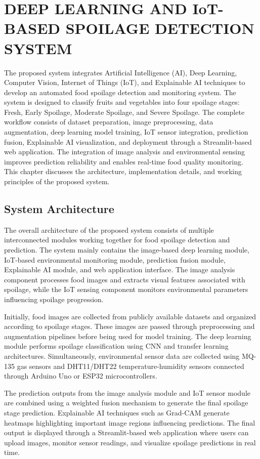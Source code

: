 \chapter{DEEP LEARNING AND IoT-BASED SPOILAGE DETECTION SYSTEM}
The proposed system integrates Artificial Intelligence (AI), Deep Learning, Computer Vision, Internet of Things (IoT), and Explainable AI techniques to develop an automated food spoilage detection and monitoring system. The system is designed to classify fruits and vegetables into four spoilage stages: Fresh, Early Spoilage, Moderate Spoilage, and Severe Spoilage. The complete workflow consists of dataset preparation, image preprocessing, data augmentation, deep learning model training, IoT sensor integration, prediction fusion, Explainable AI visualization, and deployment through a Streamlit-based web application. The integration of image analysis and environmental sensing improves prediction reliability and enables real-time food quality monitoring. This chapter discusses the architecture, implementation details, and working principles of the proposed system.

\section[System Architecture]{\textbf{System Architecture}}
The overall architecture of the proposed system consists of multiple interconnected modules working together for food spoilage detection and prediction. The system mainly contains the image-based deep learning module, IoT-based environmental monitoring module, prediction fusion module, Explainable AI module, and web application interface. The image analysis component processes food images and extracts visual features associated with spoilage, while the IoT sensing component monitors environmental parameters influencing spoilage progression.

Initially, food images are collected from publicly available datasets and organized according to spoilage stages. These images are passed through preprocessing and augmentation pipelines before being used for model training. The deep learning module performs spoilage classification using CNN and transfer learning architectures. Simultaneously, environmental sensor data are collected using MQ-135 gas sensors and DHT11/DHT22 temperature-humidity sensors connected through Arduino Uno or ESP32 microcontrollers.

The prediction outputs from the image analysis module and IoT sensor module are combined using a weighted fusion mechanism to generate the final spoilage stage prediction. Explainable AI techniques such as Grad-CAM generate heatmaps highlighting important image regions influencing predictions. The final output is displayed through a Streamlit-based web application where users can upload images, monitor sensor readings, and visualize spoilage predictions in real time.

